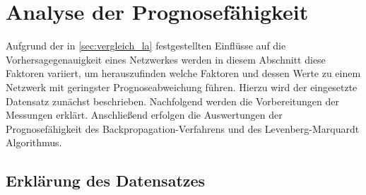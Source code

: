 

\section{Analyse der Prognosefähigkeit}\label{sec:analyse}

Aufgrund der in \autoref{sec:vergleich_la} festgestellten Einflüsse auf die Vorhersagegenauigkeit eines Netzwerkes werden in diesem Abschnitt diese Faktoren variiert, um herauszufinden welche Faktoren und dessen Werte zu einem Netzwerk mit geringster Prognoseabweichung führen. Hierzu wird der eingesetzte Datensatz zunächst beschrieben. Nachfolgend werden die Vorbereitungen der Messungen erklärt. Anschließend erfolgen die Auswertungen der Prognosefähigkeit des Backpropagation-Verfahrens und des Levenberg-Marquardt Algorithmus.



\subsection{Erklärung des Datensatzes}\label{sec:datensatz}


